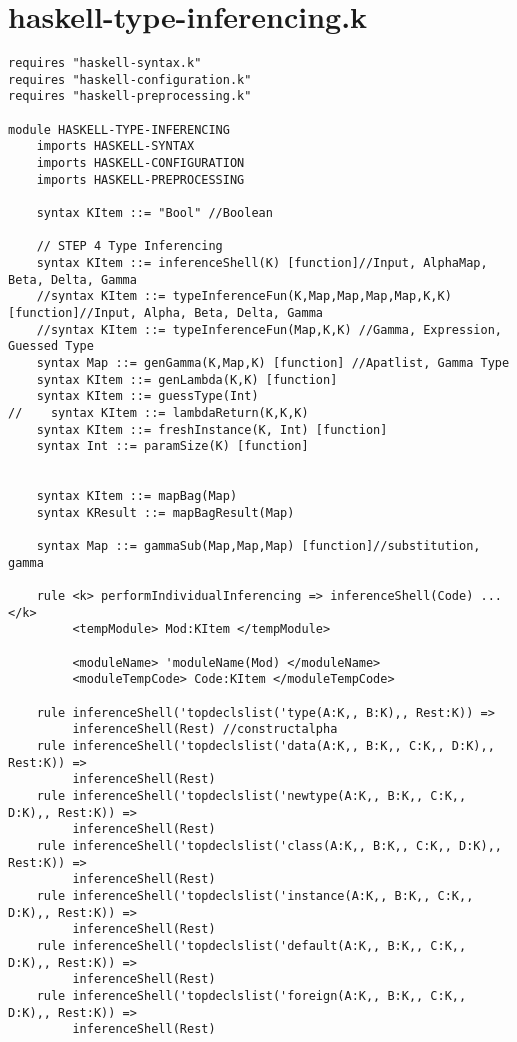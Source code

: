 \chapter{haskell-type-inferencing.k}
\begin{lstlisting}
requires "haskell-syntax.k"
requires "haskell-configuration.k"
requires "haskell-preprocessing.k"

module HASKELL-TYPE-INFERENCING
    imports HASKELL-SYNTAX
    imports HASKELL-CONFIGURATION
    imports HASKELL-PREPROCESSING

    syntax KItem ::= "Bool" //Boolean

    // STEP 4 Type Inferencing
    syntax KItem ::= inferenceShell(K) [function]//Input, AlphaMap, Beta, Delta, Gamma
    //syntax KItem ::= typeInferenceFun(K,Map,Map,Map,Map,K,K) [function]//Input, Alpha, Beta, Delta, Gamma
    //syntax KItem ::= typeInferenceFun(Map,K,K) //Gamma, Expression, Guessed Type
    syntax Map ::= genGamma(K,Map,K) [function] //Apatlist, Gamma Type
    syntax KItem ::= genLambda(K,K) [function]
    syntax KItem ::= guessType(Int)
//    syntax KItem ::= lambdaReturn(K,K,K)
    syntax KItem ::= freshInstance(K, Int) [function]
    syntax Int ::= paramSize(K) [function]


    syntax KItem ::= mapBag(Map)
    syntax KResult ::= mapBagResult(Map)

    syntax Map ::= gammaSub(Map,Map,Map) [function]//substitution, gamma

    rule <k> performIndividualInferencing => inferenceShell(Code) ...</k>
         <tempModule> Mod:KItem </tempModule>

         <moduleName> 'moduleName(Mod) </moduleName>
         <moduleTempCode> Code:KItem </moduleTempCode>

    rule inferenceShell('topdeclslist('type(A:K,, B:K),, Rest:K)) =>
         inferenceShell(Rest) //constructalpha
    rule inferenceShell('topdeclslist('data(A:K,, B:K,, C:K,, D:K),, Rest:K)) =>
         inferenceShell(Rest)
    rule inferenceShell('topdeclslist('newtype(A:K,, B:K,, C:K,, D:K),, Rest:K)) =>
         inferenceShell(Rest)
    rule inferenceShell('topdeclslist('class(A:K,, B:K,, C:K,, D:K),, Rest:K)) =>
         inferenceShell(Rest)
    rule inferenceShell('topdeclslist('instance(A:K,, B:K,, C:K,, D:K),, Rest:K)) =>
         inferenceShell(Rest)
    rule inferenceShell('topdeclslist('default(A:K,, B:K,, C:K,, D:K),, Rest:K)) =>
         inferenceShell(Rest)
    rule inferenceShell('topdeclslist('foreign(A:K,, B:K,, C:K,, D:K),, Rest:K)) =>
         inferenceShell(Rest)


\end{lstlisting}
